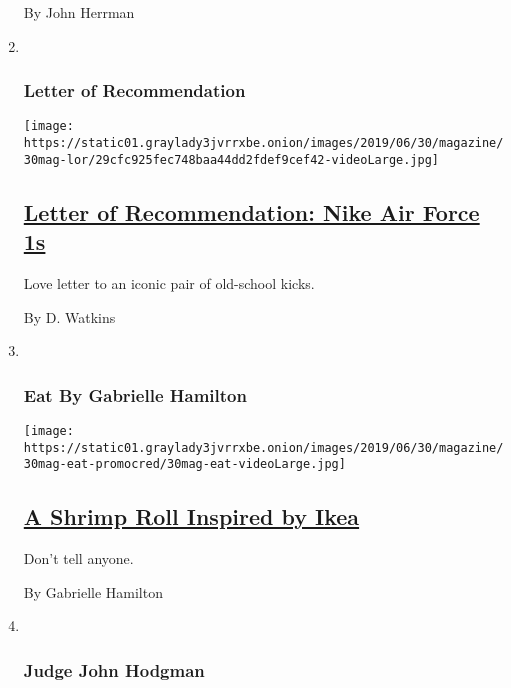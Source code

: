 \begin{enumerate}
  By John Herrman
\item ~
  \hypertarget{letter-of-recommendation}{%
  \subsubsection{Letter of
  Recommendation}\label{letter-of-recommendation}}

  \texttt{[image: https://static01.graylady3jvrrxbe.onion/images/2019/06/30/magazine/30mag-lor/29cfc925fec748baa44dd2fdef9cef42-videoLarge.jpg]}

  \hypertarget{letter-of-recommendation-nike-air-force-1s}{%
  \subsection{\texorpdfstring{\href{/2019/06/25/magazine/nike-air-force-1s-baltimore.html}{Letter
  of Recommendation: Nike Air Force
  1s}}{Letter of Recommendation: Nike Air Force 1s}}\label{letter-of-recommendation-nike-air-force-1s}}

  Love letter to an iconic pair of old-school kicks.

  By D. Watkins
\item ~
  \hypertarget{eat-by-gabrielle-hamilton}{%
  \subsubsection{Eat By Gabrielle
  Hamilton}\label{eat-by-gabrielle-hamilton}}

  \texttt{[image: https://static01.graylady3jvrrxbe.onion/images/2019/06/30/magazine/30mag-eat-promocred/30mag-eat-videoLarge.jpg]}

  \hypertarget{a-shrimp-roll-inspired-by-ikea}{%
  \subsection{\texorpdfstring{\href{/2019/06/26/magazine/shrimp-roll-recipe-ikea.html}{A
  Shrimp Roll Inspired by
  Ikea}}{A Shrimp Roll Inspired by Ikea}}\label{a-shrimp-roll-inspired-by-ikea}}

  Don't tell anyone.

  By Gabrielle Hamilton
\item ~
  \hypertarget{judge-john-hodgman}{%
  \subsubsection{Judge John Hodgman}\label{judge-john-hodgman}}


\end{enumerate}
